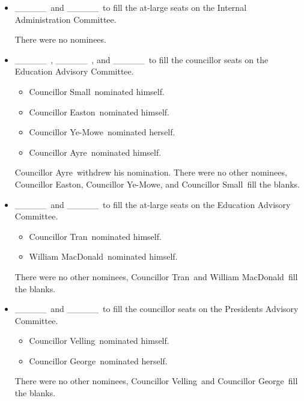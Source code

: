 \documentclass[12pt, letterpaper]{article}
\newcommand{\blank}{\_\_\_\_\_\ }
\newcommand{\tomson}{Councillor Tran}
\newcommand{\rebecca}{Councillor George}
\newcommand{\stephanie}{Councillor Ye-Mowe}
\newcommand{\subham}{Councillor Altaf}
\newcommand{\ben}{Councillor Easton}
\newcommand{\alexander}{Councillor Ayre}
\newcommand{\jason}{Councillor Small}
\newcommand{\seneca}{Councillor Velling}
\newcommand{\william}{William MacDonald}
\begin{document}
\begin{motion}
\begin{itemize}
            \tomson\ withdrew his nomination. There were no other nominees,
            \alexander\ and \subham\ fill the blanks. 

        \item \blank and \blank to fill the at-large seats on the Internal
            Administration Committee.

            There were no nominees. 

        \item \blank, \blank, and \blank to fill the councillor seats on the 
            Education Advisory Committee.
            \begin{itemize}
                \item \jason\ nominated himself.
                \item \ben\ nominated himself.
                \item \stephanie\ nominated herself.
                \item \alexander\ nominated himself. 
            \end{itemize}

            \alexander\ withdrew his nomination. There were no other nominees,
            \ben, \stephanie, and \jason\ fill the blanks. 

        \item \blank and \blank to fill the at-large seats on the 
            Education Advisory Committee.
            \begin{itemize}
                \item \tomson\ nominated himself.
                \item \william\ nominated himself.
            \end{itemize}

            There were no other nominees, \tomson\ and \william\ 
            fill the blanks. 

        \item \blank and \blank to fill the councillor seats on the 
            Presidents Advisory Committee.
            \begin{itemize}
                \item \seneca\ nominated himself.
                \item \rebecca\ nominated herself.
            \end{itemize}

            There were no other nominees, \seneca\ and \rebecca\ fill the 
            blanks. 


\end{itemize}
\end{motion}
\end{document}
